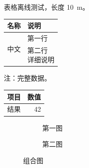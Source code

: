 \documentclass{ctexart}
\begin{document}
表格离线测试，长度 \SI{10}{\metre}。
\begin{threeparttable}
\begin{tabularx}{\linewidth}{lX}\toprule 名称 & 说明\\\midrule
\multirow{2}{*}{中文} & 第一行\\ & \makecell{第二行\\详细说明}\\\bottomrule\end{tabularx}
\begin{tablenotes}\item 注：完整数据。\end{tablenotes}
\end{threeparttable}
\begin{longtable}{lr}\toprule 项目 & 数值\\\midrule 结果 & 42\\\bottomrule\end{longtable}
\begin{figure}[h]\centering
\begin{subfigure}{.4\linewidth}\centering{}\caption{第一图}\end{subfigure}
\begin{subfigure}{.4\linewidth}\centering{}\caption{第二图}\end{subfigure}
\caption{组合图}\end{figure}
\end{document}
